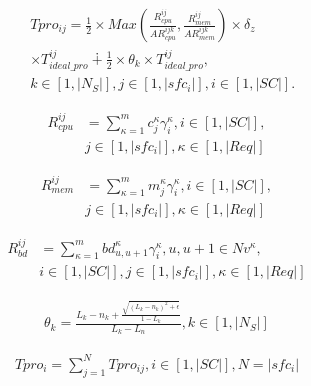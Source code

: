 \documentclass{ieeeaccess}
\begin{document}
\begin{equation}
\begin{aligned}
&Tpro_{ij}=\frac{1}{2} \times Max\left ( \frac{R_{cpu}^{ij}}{AR_{cpu}^{ijk}},\frac{R_{mem}^{ij}}{AR_{mem}^{ijk}} \right )\times \delta _{z} \\
& \times T_{ideal\_pro}^{ij} \dotplus \frac{1}{2} \times \theta _{k} \times T_{ideal\_pro}^{ij},\\
& k \in \left [ 1,|N_{S}| \right ],j \in  \left [ 1,|sfc_{i}| \right ],i \in \left [ 1,|SC| \right ].
\end{aligned}
\end{equation}

\begin{equation}
  \begin{aligned}
    R_{cpu}^{ij}&= \sum_{\kappa=1}^{m}c_{j}^{\kappa} \gamma_{i}^{\kappa}, i \in \left [ 1,|SC| \right ],\\
    &j \in \left [ 1,|sfc_{i}| \right ],\kappa \in \left [ 1,|Req| \right ]
  \end{aligned}
\end{equation}

\begin{equation}
  \begin{aligned}
    R_{mem}^{ij}&= \sum_{\kappa=1}^{m}m_{j}^{\kappa} \gamma_{i}^{\kappa}, i \in \left [ 1,|SC| \right ],\\
    &j \in \left [ 1,|sfc_{i}| \right ],\kappa \in \left [ 1,|Req| \right ]
  \end{aligned}
\end{equation}

\begin{equation}
  \begin{aligned}
    R_{bd}^{ij}&= \sum_{\kappa=1}^{m}bd_{u,u+1}^{\kappa} \gamma_{i}^{\kappa}, u,u+1 \in Nv^{\kappa}, \\
    &i \in \left [ 1,|SC| \right ], j \in \left [ 1,|sfc_{i}| \right ],\kappa \in \left [ 1,|Req| \right ]
  \end{aligned}
\end{equation}

\begin{equation}
  \begin{aligned}
\theta _{k}=\frac{L_{k}-n_{k}+\frac{\sqrt{\left ( L_{k}-n_{k} \right )^{2}+\epsilon  }}{1-L_{k}}}{L_{k}-L_{n}},k \in \left [ 1,|N_{S}| \right ]
  \end{aligned}
\end{equation}

\begin{equation}
\begin{aligned}
Tpro_{i}=\sum_{j=1}^{N}Tpro_{ij},i \in \left [ 1,|SC| \right ],N=|sfc_{i}|
\end{aligned}
\end{equation}
\end{document}
